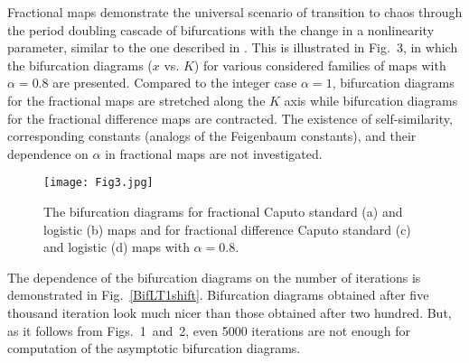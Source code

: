\documentclass[graybox]{svmult}
\begin{document}
Fractional maps demonstrate the universal scenario of transition to chaos through the period doubling cascade of bifurcations with the change in a nonlinearity parameter, similar to the one described in \cite{May}. This is illustrated in 
Fig.~3, 
in which the bifurcation diagrams ($x$ vs. $K$) for various considered families of maps with $\alpha=0.8$ are presented. Compared to the integer case $\alpha=1$, bifurcation diagrams for the fractional maps are stretched along the $K$ axis while bifurcation diagrams for the fractional difference maps are contracted.
The existence of self-similarity,
corresponding constants (analogs of the Feigenbaum constants), and
their dependence on $\alpha$ in fractional maps are not investigated.
\begin{figure}[!t]
\begin{center}
\texttt{[image: Fig3.jpg]}
\vspace{-0.25cm}
\caption{The bifurcation diagrams for fractional Caputo standard (a) 
and logistic (b) maps and for fractional difference Caputo standard
(c) and logistic (d) maps with $\alpha=0.8$.   
}
\end{center}
\label{BD}
\end{figure}
The dependence of the bifurcation diagrams on the number of iterations is demonstrated in Fig.~\ref{BifLT1shift}. Bifurcation diagrams obtained after five thousand iteration look much nicer than those obtained after two hundred. But, as it follows from 
Figs.~1~and~2, 
even 5000 iterations are not enough for computation of the asymptotic bifurcation diagrams. 
\end{document}
